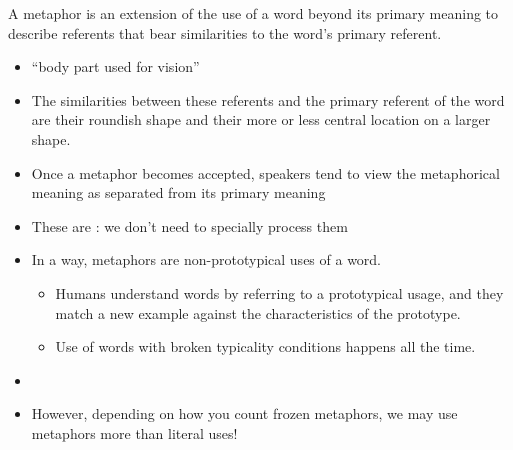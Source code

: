 \documentclass[a4paper,landscape,headrule,footrule,xetex]{foils}
\begin{document}
A metaphor is an extension of the use of a word beyond its
primary meaning to describe referents that bear similarities to
the word's primary referent.
\begin{itemize}
\item {} ``body part used for vision''
  \begin{exe}
  \ex {} 
  \ex {}
  \ex {} 
  \end{exe}
\item The similarities between these referents and the primary referent of
the word  are their roundish shape and their more or less central
location on a larger shape.
\end{itemize}

\begin{itemize}
\item Once a metaphor becomes accepted, speakers tend to view the
metaphorical meaning as separated from its primary meaning

\begin{exe}
  \ex {}
  \ex {}
  \ex {}
  \ex {}
  \ex {}
\end{exe}
\item These are : we don't need to specially process them
\end{itemize}


\begin{itemize}
\item In a way, metaphors are non-prototypical uses of a word.
\begin{itemize}
\item Humans understand words by referring to a prototypical usage,
and they match a new example against the characteristics of the
prototype.
\item  Use of words with broken typicality conditions happens all the
time.
\end{itemize}
\item
  \begin{exe}
    \ex {}
    \ex {}
    \ex {}
    \ex {}
    \ex {}
    \ex {}
  \end{exe}
\item However, depending on how you count frozen metaphors, 
we may use metaphors more than literal uses!
\end{itemize}
\end{document}
